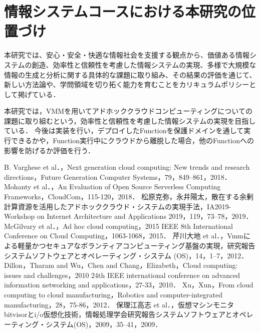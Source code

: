 \documentclass[11pt]{ujarticle} %
\begin{document}
\section{情報システムコースにおける本研究の位置づけ}
本研究では、安心・安全・快適な情報社会を支援する観点から、価値ある情報システムの創造、効率性と信頼性を考慮した情報システムの実現、多様で大規模な情報の生成と分析に関する具体的な課題に取り組み、その結果の評価を通じて、新しい方法論や、学問領域を切り拓く能力を育むことをカリキュラムポリシーとして掲げている．

本研究では，VMMを用いてアドホッククラウドコンピューティングについての課題に取り組むという，効率性と信頼性を考慮した情報システムの実現を目指している．
今後は実装を行い，デプロイしたFunctionを保護ドメインを通して実行できるかや，Function実行中にクラウドから離脱した場合，他のFunctionへの影響を防げるか評価を行う．

\begin{thebibliography}{99}
B. Varghese et al．，Next generation cloud computing: New trends and research directions，Future Generation Computer Systems，79，849–861，2018．
Mohanty et al．，An Evaluation of Open Source Serverless Computing Frameworks，CloudCom，115-120，2018．
松原克弥，永井陽太，散在する余剰計算資源を活用したアドホッククラウド・システムの実現手法，IA2019-Workshop on Internet Architecture and Applications 2019，119，73–78，2019．
McGilvary et al．，Ad hoc cloud computing，2015 IEEE 8th International Conference on Cloud Computing，1063-1068，2015．
芹川大地 et al．，Vmmによる軽量かつセキュアなボランティアコンピューティング基盤の実現，研究報告システムソフトウェアとオペレーティング・システム (OS)，14，1–7，2012．
Dillon，Tharam and Wu，Chen and Chang，Elizabeth，Cloud computing: issues and challenges，2010 24th IEEE international conference on advanced information networking and applications，27-33，2010．
Xu，Xun，From cloud computing to cloud manufacturing，Robotics and computer-integrated manufacturing，28，75-86，2012．
保理江高志 et al．，仮想マシンモニタbitvisorとi/o仮想化技術，情報処理学会研究報告システムソフトウェアとオペレーティング・システム(OS)，2009，35–41，2009．
\end{thebibliography}
\end{document}

